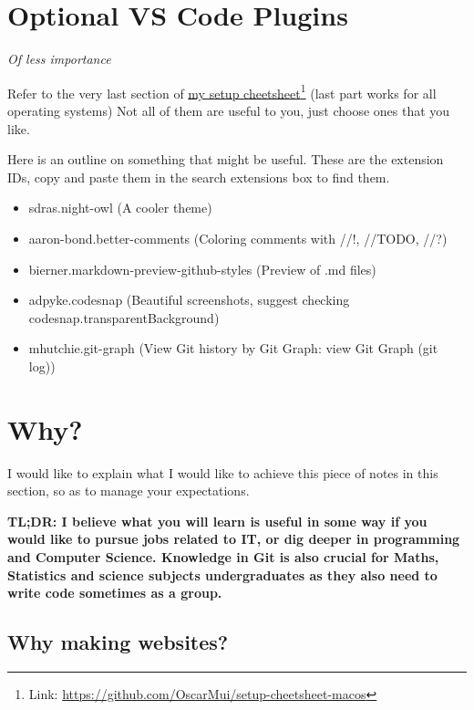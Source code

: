 \section{Optional VS Code Plugins}
\textit{Of less importance}
\vspace{6mm}

Refer to the very last section of \href{https://github.com/OscarMui/setup-cheetsheet-macos}{my setup cheetsheet}\footnote{Link: \url{https://github.com/OscarMui/setup-cheetsheet-macos}} (last part works for all operating systems) Not all of them are useful to you, just choose ones that you like.

Here is an outline on something that might be useful. These are the extension IDs, copy and paste them in the search extensions box to find them.

\begin{itemize}
    \item sdras.night-owl (A cooler theme)
    \item aaron-bond.better-comments (Coloring comments with //!, //TODO, //?)
    \item bierner.markdown-preview-github-styles (Preview of .md files) 
    \item adpyke.codesnap (Beautiful screenshots, suggest checking codesnap.transparentBackground)
    \item mhutchie.git-graph (View Git history by Git Graph: view Git Graph (git log))
\end{itemize}

\section{Why?}
\label{sec:rationale}

I would like to explain what I would like to achieve this piece of notes in this section, so as to manage your expectations.
\vspace{6mm}

\textbf{TL;DR: I believe what you will learn is useful in some way if you would like to pursue jobs related to IT, or dig deeper in programming and Computer Science. Knowledge in Git is also crucial for Maths, Statistics and science subjects undergraduates as they also need to write code sometimes as a group.}

\subsection*{Why making websites?}

